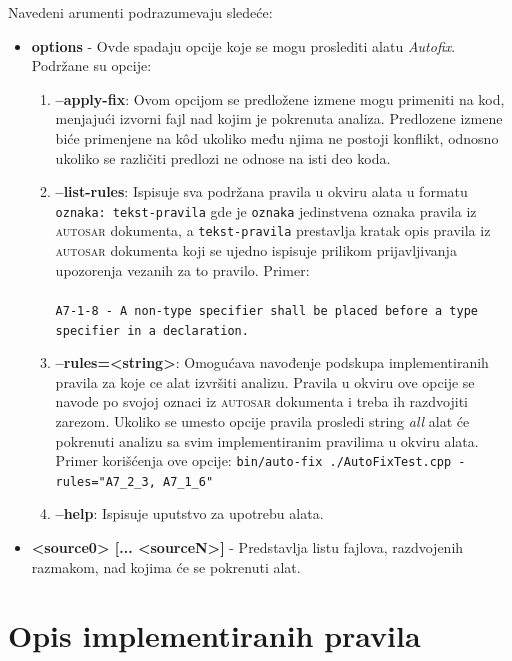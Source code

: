 \documentclass[12pt,oneside]{memoir}
\begin{document}
Navedeni arumenti podrazumevaju sledeće:
\begin{itemize}
  \item \textbf{options} - Ovde spadaju opcije koje se mogu proslediti alatu \textit{Autofix}. Podr\v{z}ane su opcije:
  \begin{enumerate}
    \item \textbf{--apply-fix}: Ovom opcijom se predlo\v{z}ene izmene mogu primeniti na kod, menjaju\'{c}i izvorni fajl nad kojim je pokrenuta analiza.
    Predlozene izmene bi\'{c}e primenjene na k\^{o}d ukoliko među njima ne postoji konflikt, odnosno ukoliko se razli\v{c}iti predlozi ne odnose na isti deo koda.
    \item \textbf{--list-rules}: Ispisuje sva podr\v{z}ana pravila u okviru alata u formatu \texttt{oznaka: tekst-pravila} gde je \texttt{oznaka} jedinstvena oznaka pravila iz \textsc{autosar} dokumenta, a \texttt{tekst-pravila} prestavlja kratak opis pravila iz \textsc{autosar} dokumenta koji se ujedno ispisuje prilikom prijavljivanja upozorenja vezanih za to pravilo. Primer: \\ \\
  \texttt{A7-1-8 - A non-type specifier shall be placed before a type specifier in a declaration.} \\
    \item \textbf{--rules=<string>}: Omogu\'{c}ava navođenje podskupa implementiranih pravila za koje ce alat izvr\v{s}iti analizu. Pravila u okviru ove opcije
    se navode po svojoj oznaci iz \textsc{autosar} dokumenta i treba ih razdvojiti zarezom. Ukoliko se umesto opcije pravila prosledi string \textit{all} alat \'{c}e pokrenuti
    analizu sa svim implementiranim pravilima u okviru alata. Primer kori\v{s}\'{c}enja ove opcije: \newline\newline
    \texttt{bin/auto-fix ./AutoFixTest.cpp -rules="A7\_2\_3, A7\_1\_6"} \\
    \item \textbf{--help}: Ispisuje uputstvo za upotrebu alata.
  \end{enumerate}

\item \textbf{<source0> [... <sourceN>]} - Predstavlja listu fajlova, razdvojenih razmakom, nad kojima \'{c}e se pokrenuti alat.

\end{itemize}

\section{Opis implementiranih pravila}
\end{document}
